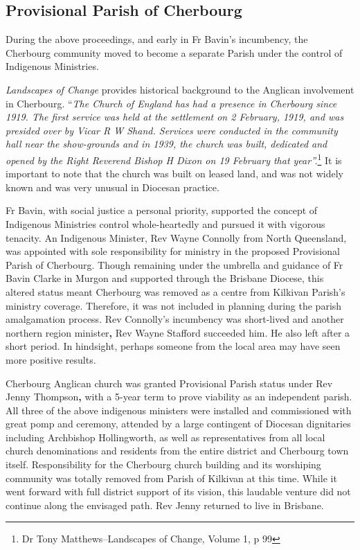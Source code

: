 \hypertarget{provisional-parish-of-cherbourg}{%
\subsection{Provisional Parish of Cherbourg}\label{provisional-parish-of-cherbourg}}

During the above proceedings, and early in Fr Bavin's incumbency, the Cherbourg community moved to become a separate Parish under the control of Indigenous Ministries.

\emph{Landscapes of Change} provides historical background to the Anglican involvement in Cherbourg. ``\emph{The Church of England has had a presence in Cherbourg since 1919. The first service was held at the settlement on 2 February, 1919, and was presided over by Vicar R W Shand. Services were conducted in the community hall near the show-grounds and in 1939, the church was built, dedicated and opened by the Right Reverend Bishop H Dixon on 19 February that year''.}\footnote{Dr Tony Matthews--Landscapes of Change, Volume 1, p 99} It is important to note that the church was built on leased land, and was not widely known and was very unusual in Diocesan practice.

Fr Bavin, with social justice a personal priority, supported the concept of Indigenous Ministries control whole-heartedly and pursued it with vigorous tenacity. An Indigenous Minister, Rev Wayne Connolly from North Queensland, was appointed with sole responsibility for ministry in the proposed Provisional Parish of Cherbourg. Though remaining under the umbrella and guidance of Fr Bavin Clarke in Murgon and supported through the Brisbane Diocese, this altered status meant Cherbourg was removed as a centre from Kilkivan Parish's ministry coverage. Therefore, it was not included in planning during the parish amalgamation process. Rev Connolly's incumbency was short-lived and another northern region minister\textbf{,} Rev Wayne Stafford succeeded him. He also left after a short period. In hindsight, perhaps someone from the local area may have seen more positive results.

Cherbourg Anglican church was granted Provisional Parish status under Rev Jenny Thompson\textbf{,} with a 5-year term to prove viability as an independent parish. All three of the above indigenous ministers were installed and commissioned with great pomp and ceremony, attended by a large contingent of Diocesan dignitaries including Archbishop Hollingworth, as well as representatives from all local church denominations and residents from the entire district and Cherbourg town itself. Responsibility for the Cherbourg church building and its worshiping community was totally removed from Parish of Kilkivan at this time. While it went forward with full district support of its vision, this laudable venture did not continue along the envisaged path. Rev Jenny returned to live in Brisbane.

